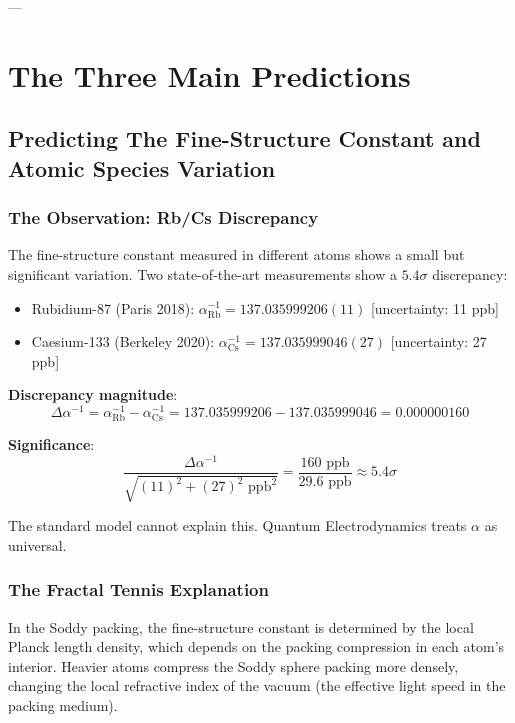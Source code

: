 \documentclass[11pt,a4paper]{article}
\begin{document}
---



\section{The Three Main Predictions}

  \subsection{Predicting The Fine-Structure Constant and Atomic Species Variation}

    \subsubsection{The Observation: Rb/Cs Discrepancy}

      The fine-structure constant measured in different atoms shows a small but significant variation. Two state-of-the-art measurements show a $5.4\sigma$ discrepancy:

      \begin{itemize}
        \item Rubidium-87 (Paris 2018): $\alpha^{-1}_\mathrm{Rb} = 137.035999206(11)$ [uncertainty: 11 ppb]
        \item Caesium-133 (Berkeley 2020): $\alpha^{-1}_\mathrm{Cs} = 137.035999046(27)$ [uncertainty: 27 ppb]
      \end{itemize}

      \noindent\textbf{Discrepancy magnitude}:
        \[
        \Delta\alpha^{-1} = \alpha^{-1}_\mathrm{Rb} - \alpha^{-1}_\mathrm{Cs} = 137.035999206 - 137.035999046 = 0.000000160
        \]

      \noindent\textbf{Significance}:
        \[
        \frac{\Delta\alpha^{-1}}{\sqrt{(11)^2 + (27)^2 \text{ ppb}^2}} = \frac{160 \text{ ppb}}{29.6 \text{ ppb}} \approx 5.4\sigma
        \]

    The standard model cannot explain this. Quantum Electrodynamics treats $\alpha$ as universal.

    \subsubsection{The Fractal Tennis Explanation}

      In the Soddy packing, the fine-structure constant is determined by the local Planck length density, which depends on the packing compression in each atom's interior. Heavier atoms compress the Soddy sphere packing more densely, changing the local refractive index of the vacuum (the effective light speed in the packing medium).
\end{document}
